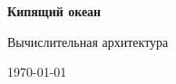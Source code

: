 \begin{titlepage}
  \centering
  \vspace*{2cm}
  {\LARGE\bfseries Кипящий океан\par}
  \vspace{0.8cm}
  {\Large Вычислительная архитектура\par}
  \vfill
  {\large \today\par}
\end{titlepage}
\clearpage

\clearpage
\tableofcontents
\clearpage
